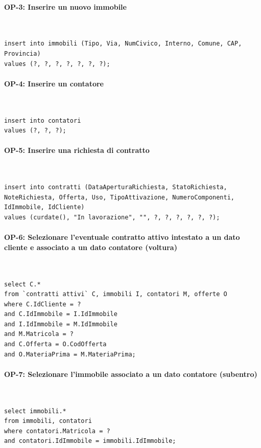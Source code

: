 \documentclass[a4paper,12pt]{report}
\begin{document}
\paragraph{OP-3: Inserire un nuovo immobile}\mbox{}\\
\begin{lstlisting}
insert into immobili (Tipo, Via, NumCivico, Interno, Comune, CAP, Provincia)
values (?, ?, ?, ?, ?, ?, ?);
\end{lstlisting}
    
\paragraph{OP-4: Inserire un contatore}\mbox{}\\
\begin{lstlisting}
insert into contatori
values (?, ?, ?);
\end{lstlisting}

\paragraph{OP-5: Inserire una richiesta di contratto}\mbox{}\\
\begin{lstlisting}
insert into contratti (DataAperturaRichiesta, StatoRichiesta, NoteRichiesta, Offerta, Uso, TipoAttivazione, NumeroComponenti, IdImmobile, IdCliente)
values (curdate(), "In lavorazione", "", ?, ?, ?, ?, ?, ?);
\end{lstlisting}

\paragraph{OP-6: Selezionare l'eventuale contratto attivo intestato a un dato cliente e associato a un dato contatore (voltura)}\mbox{}\\
\begin{lstlisting}
select C.*
from `contratti attivi` C, immobili I, contatori M, offerte O
where C.IdCliente = ?
and C.IdImmobile = I.IdImmobile
and I.IdImmobile = M.IdImmobile
and M.Matricola = ?
and C.Offerta = O.CodOfferta
and O.MateriaPrima = M.MateriaPrima;
\end{lstlisting}

\paragraph{OP-7: Selezionare l'immobile associato a un dato contatore (subentro)}\mbox{}\\
\begin{lstlisting}
select immobili.*
from immobili, contatori
where contatori.Matricola = ?
and contatori.IdImmobile = immobili.IdImmobile;
\end{lstlisting}
\end{document}
